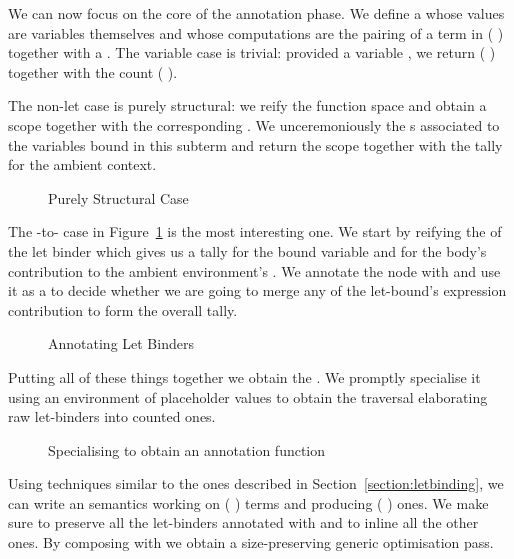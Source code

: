 We can now focus on the core of the annotation phase. We define a
 whose values are variables themselves and whose computations
are the pairing of a term in {(  )} together with
a . The variable case is trivial: provided a variable ,
we return {( )} together with the count {( )}.

The non-let case is purely structural: we reify the  function
space and obtain a scope together with the corresponding . We
unceremoniously  the s associated to the variables
bound in this subterm and return the scope together with the tally for
the ambient context.

\begin{figure}[h]
  \caption{Purely Structural Case}
\end{figure}

The -to- case in Figure~\ref{fig:lettoclet} is the most
interesting one. We start by reifying the  of the let binder which
gives us a tally  for the bound variable and  for the body's
contribution to the ambient environment's . We annotate the node
with  and use it as a  to decide whether we are going to
merge any of the let-bound's expression contribution  to form the
overall tally.

\begin{figure}[h]
  \caption{Annotating Let Binders}\label{fig:lettoclet}
\end{figure}

Putting all of these things together we obtain the  .
We promptly specialise it using an environment of placeholder values to obtain
the traversal  elaborating raw let-binders into counted ones.

\begin{figure}[h]
\caption{Specialising  to obtain an annotation function}
\end{figure}

Using techniques similar to the ones described in Section~\ref{section:letbinding},
we can write an  semantics working on {(  )} terms
and producing {(  )} ones. We make sure to preserve all the
let-binders annotated with  and to inline all the other ones. By composing
 with  we obtain a size-preserving generic optimisation pass.
